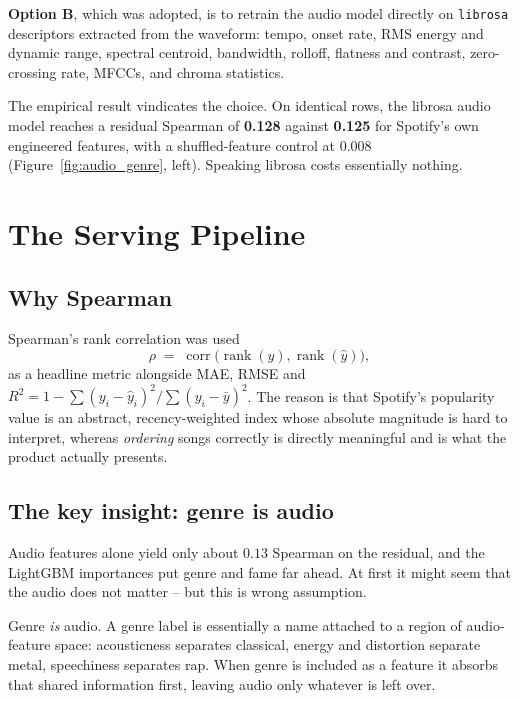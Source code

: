\documentclass[10pt,twocolumn]{article}
\begin{document}
\textbf{Option B}, which was adopted, is to retrain the audio model directly on
\texttt{librosa} descriptors extracted from the waveform: tempo, onset rate, RMS
energy and dynamic range, spectral centroid, bandwidth, rolloff, flatness and
contrast, zero-crossing rate, MFCCs, and chroma statistics.

The empirical result vindicates the choice. On identical rows, the librosa audio
model reaches a residual Spearman of \textbf{0.128} against \textbf{0.125} for
Spotify's own engineered features, with a shuffled-feature control at $0.008$
(Figure~\ref{fig:audio_genre}, left). Speaking librosa costs essentially
nothing.

\section{The Serving Pipeline}

\subsection{Why Spearman}

Spearman's rank correlation was used
\begin{equation}
\rho \;=\; \operatorname{corr}\!\big(\operatorname{rank}(y), \operatorname{rank}(\hat{y})\big),
\end{equation}
as a headline metric alongside MAE, RMSE and
$R^2 = 1 - \sum(y_i-\hat y_i)^2 / \sum(y_i-\bar y)^2$. The reason is that
Spotify's popularity value is an abstract, recency-weighted index whose absolute
magnitude is hard to interpret, whereas \emph{ordering} songs correctly is
directly meaningful and is what the product actually presents.

\subsection{The key insight: genre is audio}

Audio features alone yield only about $0.13$ Spearman on the residual, and the
LightGBM importances put genre and fame far ahead. At first it might seem that the audio does not matter -- but this is wrong assumption.

Genre \emph{is} audio. A genre label is essentially a name attached to a region
of audio-feature space: acousticness separates classical, energy and distortion
separate metal, speechiness separates rap. When genre is included as a feature it
absorbs that shared information first, leaving audio only whatever is left over.
\end{document}
